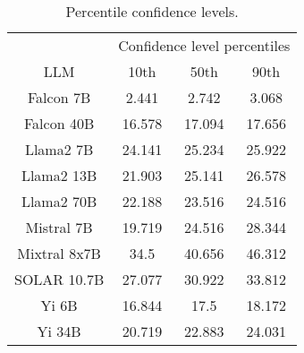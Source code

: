 \begin{table*}
\centering
\begin{tabular}{c|c|c|c}
& \multicolumn{3}{c}{Confidence level percentiles} \\ 
LLM & 10th & 50th & 90th\\ \hline
Falcon 7B & 2.441 & 2.742 & 3.068\\
Falcon 40B & 16.578 & 17.094 & 17.656\\
Llama2 7B & 24.141 & 25.234 & 25.922\\
Llama2 13B & 21.903 & 25.141 & 26.578\\
Llama2 70B & 22.188 & 23.516 & 24.516\\
Mistral 7B & 19.719 & 24.516 & 28.344\\
Mixtral 8x7B & 34.5 & 40.656 & 46.312\\
SOLAR 10.7B & 27.077 & 30.922 & 33.812\\
Yi 6B & 16.844 & 17.5 & 18.172\\
Yi 34B & 20.719 & 22.883 & 24.031\\
\hline
\end{tabular}
\caption{Percentile confidence levels.}
\label{tab:percentile_conf}
\end{table*}
